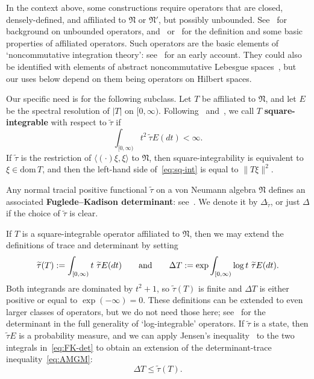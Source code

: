 \documentclass[12pt,a4paper]{article}
\numberwithin{equation}{section}
\theoremstyle{remark}
\newcommand{\N}{\mathfrak{N}}
\renewcommand{\t}[1]{\widetilde{#1}}
\newcommand{\dom}{\mathrm{dom}\,}
\begin{document}
In the context above, some constructions require operators that are closed, densely-defined, and affiliated to $\N$ or $\N'$, but possibly unbounded.  See~\cite[Chap. VIII]{ReeSimFA} for background on unbounded operators, and~\cite[Exers. I.1.10 and III.1.13]{Dix--vN} or~\cite[App. F]{BroOza08} for the definition and some basic properties of affiliated operators.  Such operators are the basic elements of `noncommutative integration theory': see~\cite{Seg53,Seg53b} for an early account.  They could also be identified with elements of abstract noncommutative Lebesgue spaces~\cite{PisXuNCLP}, but our uses below depend on them being operators on Hilbert spaces. %

Our specific need is for the following subclass. Let $T$ be affiliated to $\N$, and let $E$ be the spectral resolution of $|T|$ on $[0,\infty)$.  Following~\cite[Subsec. 3.4]{Seg53} and~\cite[App. F]{BroOza08}, we call $T$ \textbf{square-integrable} with respect to $\t{\tau}$ if
\begin{equation}\label{eq:sq-int}
\int_{[0,\infty)}t^2\ \t{\tau} E(dt) < \infty.
\end{equation}
If $\t{\tau}$ is the restriction of $\langle (\cdot)\xi,\xi\rangle$ to $\N$, then square-integrability is equivalent to $\xi \in \dom T$, and then the left-hand side of~\eqref{eq:sq-int} is equal to $\|T\xi\|^2$.

Any normal tracial positive functional $\t{\tau}$ on a von Neumann algebra $\N$ defines an associated \textbf{Fuglede--Kadison determinant}: see~\cite[Sec. I.6.11]{Dix--vN}.  We denote it by $\Delta_{\t{\tau}}$, or just $\Delta$ if the choice of $\t{\tau}$ is clear.

If $T$ is a square-integrable operator affiliated to $\N$, then we may extend the definitions of trace and determinant by setting
\begin{equation}\label{eq:FK-det}
\t{\tau}(T) := \int_{[0,\infty)}t\ \t{\tau}E(dt) \qquad \hbox{and}\qquad \Delta T := \exp \int_{[0,\infty)} \log t\ \t{\tau} E(dt).
\end{equation}
Both integrands are dominated by $t^2+1$, so $\t{\tau}(T)$ is finite and $\Delta T$ is either positive or equal to $\exp(-\infty) = 0$.  These definitions can be extended to even larger classes of operators, but we do not need those here; see~\cite[Sec. 2]{HaaSch07} for the determinant in the full generality of `log-integrable' operators.  If $\t{\tau}$ is a state, then $\t{\tau} E$ is a probability measure, and we can apply Jensen's inequality~\cite[Thm. 3.3]{Rudin--realcplx} to the two integrals in~\eqref{eq:FK-det} to obtain an extension of the determinant-trace inequality~\eqref{eq:AMGM}:
\begin{equation}\label{eq:AMGM2}
\Delta T\le \t{\tau}(T).
\end{equation}
\end{document}
